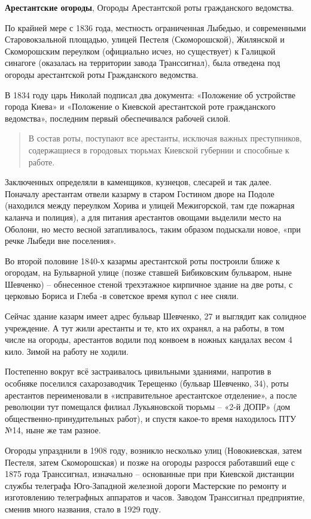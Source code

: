 \medskip


\textbf{Арестантские огороды}, Огороды Арестантской роты гражданского ведомства.

По крайней мере с 1836 года, местность ограниченная Лыбедью, и современными Старовокзальной площадью, улицей Пестеля (Скоморошской), Жилянской и Скоморошским переулком (официально исчез, но существует) к Галицкой синагоге (оказалась на территории завода Транссигнал), была отведена под огороды арестантской роты Гражданского ведомства.

В 1834 году царь Николай подписал два документа: «Положение об устройстве города Киева» и «Положение о Киевской арестантской роте гражданского ведомства», последним первый обеспечивался рабочей силой.

\begin{quotation}
В состав роты, поступают все арестанты, исключая важных преступников, содержащиеся в городовых тюрьмах Киевской губернии и способные к работе.
\end{quotation}

Заключенных определяли в каменщиков, кузнецов, слесарей и так далее. Поначалу арестантам отвели казарму в старом Гостином дворе на Подоле (находился между переулком Хорива и улицей Межигорской, там где пожарная каланча и полиция), а для питания арестантов овощами выделили место на Оболони, но место весной затапливалось, таким образом подыскали новое, «при речке Лыбеди вне поселения».

Во второй половине 1840-х казармы арестантской роты построили ближе к огородам, на Бульварной улице (позже ставшей Бибиковским бульваром, ныне Шевченко) – обнесенное стеной трехэтажное кирпичное здание на две роты, с церковью Бориса и Глеба -в советское время купол с нее сняли.  

Сейчас здание казарм имеет адрес бульвар Шевченко, 27 и выглядит как солидное учреждение. А тут жили арестанты и те, кто их охранял, а на работы, в том числе на огороды, арестантов водили под конвоем в ножных кандалах весом 4 кило. Зимой на работу не ходили.

Постепенно вокруг всё застраивалось цивильными зданиями, напротив в особняке поселился сахарозаводчик Терещенко (бульвар Шевченко, 34), роты арестантов переименовали в «исправительное арестантское отделение», а после революции тут помещался филиал Лукьяновской тюрьмы – «2-й ДОПР» (дом общественно-принудительных работ), и спустя какое-то время находилось ПТУ №14, ныне же там разное.

Огороды упразднили в 1908 году, возникло несколько улиц (Новокиевская, затем Пестеля, затем Скоморошская) и позже на огороды разросся работавший еще с 1875 года Транссигнал, изначально – основанные при при Киевской дистанции службы телеграфа Юго-Западной железной дороги Мастерские по ремонту и изготовлению телеграфных аппаратов и часов. Заводом Транссигнал предприятие, сменив много названия, стало в 1929 году.

